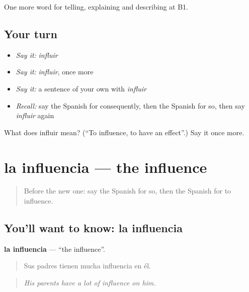 \begin{grammarlens}[title={What you've built}]
One more word for telling, explaining and describing at B1.
\end{grammarlens}

\subsection*{Your turn}
\begin{itemize}
\raggedright
  \item \emph{Say it:} \emph{influir}
  \item \emph{Say it:} \emph{influir}, once more
  \item \emph{Say it:} a sentence of your own with \emph{influir}
  \item \emph{Recall:} say the Spanish for consequently, then the Spanish for so, then say \emph{influir} again
\end{itemize}

\begin{tcolorbox}[breakable,colback=teal!4,colframe=teal!35!black,title={Before you move on}]
What does influir mean? (\textquotedblleft{}To influence, to have an effect\textquotedblright{}.) Say it once more.
\end{tcolorbox}
\section[la influencia]{la influencia — the influence}

\label{lesson:ES-C583-influencia}



\begin{quote}
Before the new one: say the Spanish for so, then the Spanish for to influence.
\end{quote}

\subsection*{You'll want to know: la influencia}
\textbf{la influencia} — \textquotedblleft{}the influence\textquotedblright{}.

\begin{quote}
Sus padres tienen mucha influencia en él.
\end{quote}

\begin{quote}
\emph{His parents have a lot of influence on him.}
\end{quote}

